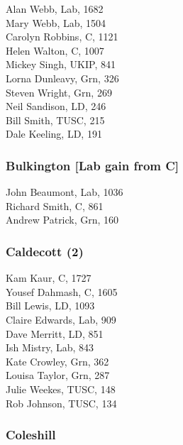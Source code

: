\documentclass[a4paper,openany,10pt]{book}
\begin{document}


Alan Webb, Lab, 1682\\
Mary Webb, Lab, 1504\\
Carolyn Robbins, C, 1121\\
Helen Walton, C, 1007\\
Mickey Singh, UKIP, 841\\
Lorna Dunleavy, Grn, 326\\
Steven Wright, Grn, 269\\
Neil Sandison, LD, 246\\
Bill Smith, TUSC, 215\\
Dale Keeling, LD, 191\\


\subsubsection*{Bulkington \hspace*{\fill}\nolinebreak[1]%
\enspace\hspace*{\fill}
[Lab gain from C]}



John Beaumont, Lab, 1036\\
Richard Smith, C, 861\\
Andrew Patrick, Grn, 160\\


\subsubsection*{Caldecott (2)}



Kam Kaur, C, 1727\\
Yousef Dahmash, C, 1605\\
Bill Lewis, LD, 1093\\
Claire Edwards, Lab, 909\\
Dave Merritt, LD, 851\\
Ish Mistry, Lab, 843\\
Kate Crowley, Grn, 362\\
Louisa Taylor, Grn, 287\\
Julie Weekes, TUSC, 148\\
Rob Johnson, TUSC, 134\\


\subsubsection*{Coleshill}
\end{document}
